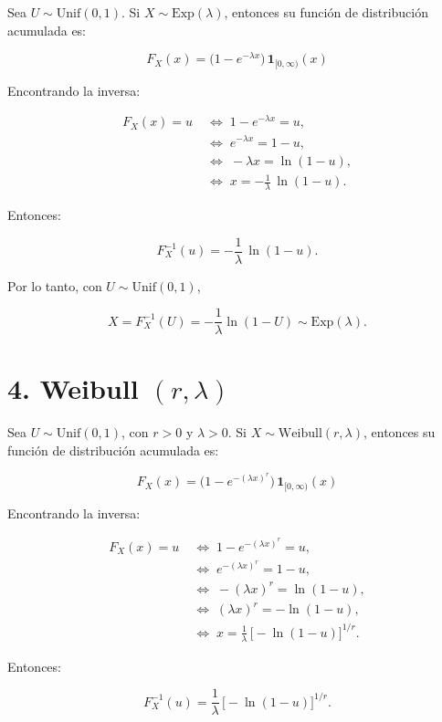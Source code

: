 \documentclass[10pt,a4paper]{article}
\begin{document}
    Sea \textbf{\(U\sim\mathrm{Unif}(0,1)\)}. Si
\(X\sim\mathrm{Exp}(\lambda)\), entonces su función de distribución
acumulada es:

\[
F_X(x)=\bigl(1-e^{-\lambda x}\bigr)\,\mathbf{1}_{[0,\infty)}(x)
\]

Encontrando la inversa:

\[
\begin{aligned}
F_X(x)=u &\;\iff\; 1-e^{-\lambda x}=u,\\
         &\;\iff\; e^{-\lambda x}=1-u,\\
         &\;\iff\; -\lambda x=\ln(1-u),\\
         &\;\iff\; x=-\frac{1}{\lambda}\,\ln(1-u).
\end{aligned}
\]

Entonces:

\[
F_X^{-1}(u)=-\frac{1}{\lambda}\,\ln(1-u).
\]

Por lo tanto, con \(U\sim\mathrm{Unif}(0,1)\),

\[
X=F_X^{-1}(U)=-\frac{1}{\lambda}\ln(1-U)\sim\mathrm{Exp}(\lambda).
\]

    \hypertarget{weibull-rlambda}{%
\section{\texorpdfstring{4. Weibull
\((r,\lambda)\)}{4. Weibull (r,\textbackslash lambda)}}\label{weibull-rlambda}}

    Sea \textbf{\(U\sim\mathrm{Unif}(0,1)\)}, con \(r>0\) y \(\lambda>0\).
Si \(X\sim\mathrm{Weibull}(r,\lambda)\), entonces su función de
distribución acumulada es:

\[
F_X(x)=\bigl(1-e^{-(\lambda x)^r}\bigr)\,\mathbf{1}_{[0,\infty)}(x)
\]

Encontrando la inversa:

\[
\begin{aligned}
F_X(x)=u &\;\iff\; 1-e^{-(\lambda x)^r}=u,\\
         &\;\iff\; e^{-(\lambda x)^r}=1-u,\\
         &\;\iff\; -(\lambda x)^r=\ln(1-u),\\
         &\;\iff\; (\lambda x)^r=-\ln(1-u),\\
         &\;\iff\; x=\frac{1}{\lambda}\,\bigl[-\ln(1-u)\bigr]^{1/r}.
\end{aligned}
\]

Entonces:

\[
F_X^{-1}(u)=\frac{1}{\lambda}\,\bigl[-\ln(1-u)\bigr]^{1/r}.
\]
\end{document}
